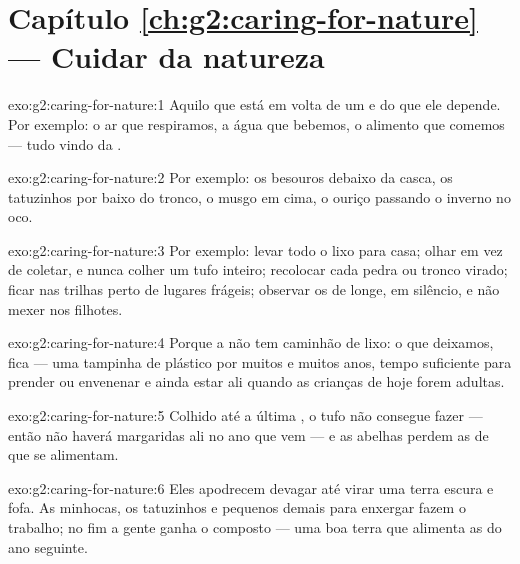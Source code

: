 \section*{Capítulo \ref{ch:g2:caring-for-nature} --- Cuidar da natureza}

\begin{solution}{exo:g2:caring-for-nature:1}
Aquilo que está em volta de um  e do que ele depende. Por
exemplo: o ar que respiramos, a água que bebemos, o alimento que
comemos --- tudo vindo da .
\end{solution}

\begin{solution}{exo:g2:caring-for-nature:2}
Por exemplo: os besouros debaixo da casca, os tatuzinhos por baixo
do tronco, o musgo em cima, o ouriço passando o inverno no oco.
\end{solution}

\begin{solution}{exo:g2:caring-for-nature:3}
Por exemplo: levar todo o lixo para casa; olhar em vez de coletar, e
nunca colher um tufo inteiro; recolocar cada pedra ou tronco
virado; ficar nas trilhas perto de lugares frágeis; observar os
 de longe, em silêncio, e não mexer nos filhotes.
\end{solution}

\begin{solution}{exo:g2:caring-for-nature:4}
Porque a  não tem caminhão de lixo: o que deixamos, fica ---
uma tampinha de plástico por muitos e muitos anos, tempo suficiente
para prender ou envenenar  e ainda estar ali quando as
crianças de hoje forem adultas.
\end{solution}

\begin{solution}{exo:g2:caring-for-nature:5}
Colhido até a última , o tufo não consegue fazer  ---
então não haverá margaridas ali no ano que vem --- e as abelhas
perdem as  de que se alimentam.
\end{solution}

\begin{solution}{exo:g2:caring-for-nature:6}
Eles apodrecem devagar até virar uma terra escura e fofa. As
minhocas, os tatuzinhos e  pequenos demais para enxergar
fazem o trabalho; no fim a gente ganha o composto --- uma boa terra
que alimenta as  do ano seguinte.
\end{solution}


